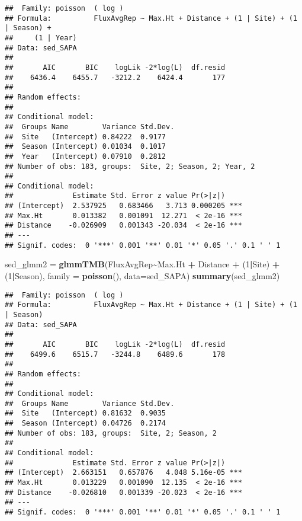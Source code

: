 \documentclass[
]{article}
\newenvironment{Shaded}{\begin{snugshade}}{\end{snugshade}}
\newcommand{\AttributeTok}[1]{\textcolor[rgb]{0.13,0.29,0.53}{#1}}
\newcommand{\DecValTok}[1]{\textcolor[rgb]{0.00,0.00,0.81}{#1}}
\newcommand{\FunctionTok}[1]{\textcolor[rgb]{0.13,0.29,0.53}{\textbf{#1}}}
\newcommand{\NormalTok}[1]{#1}
\newcommand{\OtherTok}[1]{\textcolor[rgb]{0.56,0.35,0.01}{#1}}
\newcommand{\SpecialCharTok}[1]{\textcolor[rgb]{0.81,0.36,0.00}{\textbf{#1}}}
\begin{document}
\begin{verbatim}
##  Family: poisson  ( log )
## Formula:          FluxAvgRep ~ Max.Ht + Distance + (1 | Site) + (1 | Season) +  
##     (1 | Year)
## Data: sed_SAPA
## 
##       AIC       BIC    logLik -2*log(L)  df.resid 
##    6436.4    6455.7   -3212.2    6424.4       177 
## 
## Random effects:
## 
## Conditional model:
##  Groups Name        Variance Std.Dev.
##  Site   (Intercept) 0.84222  0.9177  
##  Season (Intercept) 0.01034  0.1017  
##  Year   (Intercept) 0.07910  0.2812  
## Number of obs: 183, groups:  Site, 2; Season, 2; Year, 2
## 
## Conditional model:
##              Estimate Std. Error z value Pr(>|z|)    
## (Intercept)  2.537925   0.683466   3.713 0.000205 ***
## Max.Ht       0.013382   0.001091  12.271  < 2e-16 ***
## Distance    -0.026909   0.001343 -20.034  < 2e-16 ***
## ---
## Signif. codes:  0 '***' 0.001 '**' 0.01 '*' 0.05 '.' 0.1 ' ' 1
\end{verbatim}

\begin{Shaded}
\begin{Highlighting}[]
\NormalTok{sed\_glmm2 }\OtherTok{=} \FunctionTok{glmmTMB}\NormalTok{(FluxAvgRep}\SpecialCharTok{\textasciitilde{}}\NormalTok{Max.Ht }\SpecialCharTok{+}\NormalTok{ Distance }\SpecialCharTok{+}\NormalTok{ (}\DecValTok{1}\SpecialCharTok{|}\NormalTok{Site) }\SpecialCharTok{+}\NormalTok{ (}\DecValTok{1}\SpecialCharTok{|}\NormalTok{Season), }\AttributeTok{family =} \FunctionTok{poisson}\NormalTok{(), }\AttributeTok{data=}\NormalTok{sed\_SAPA)}
\FunctionTok{summary}\NormalTok{(sed\_glmm2)}
\end{Highlighting}
\end{Shaded}

\begin{verbatim}
##  Family: poisson  ( log )
## Formula:          FluxAvgRep ~ Max.Ht + Distance + (1 | Site) + (1 | Season)
## Data: sed_SAPA
## 
##       AIC       BIC    logLik -2*log(L)  df.resid 
##    6499.6    6515.7   -3244.8    6489.6       178 
## 
## Random effects:
## 
## Conditional model:
##  Groups Name        Variance Std.Dev.
##  Site   (Intercept) 0.81632  0.9035  
##  Season (Intercept) 0.04726  0.2174  
## Number of obs: 183, groups:  Site, 2; Season, 2
## 
## Conditional model:
##              Estimate Std. Error z value Pr(>|z|)    
## (Intercept)  2.663151   0.657876   4.048 5.16e-05 ***
## Max.Ht       0.013229   0.001090  12.135  < 2e-16 ***
## Distance    -0.026810   0.001339 -20.023  < 2e-16 ***
## ---
## Signif. codes:  0 '***' 0.001 '**' 0.01 '*' 0.05 '.' 0.1 ' ' 1
\end{verbatim}
\end{document}
